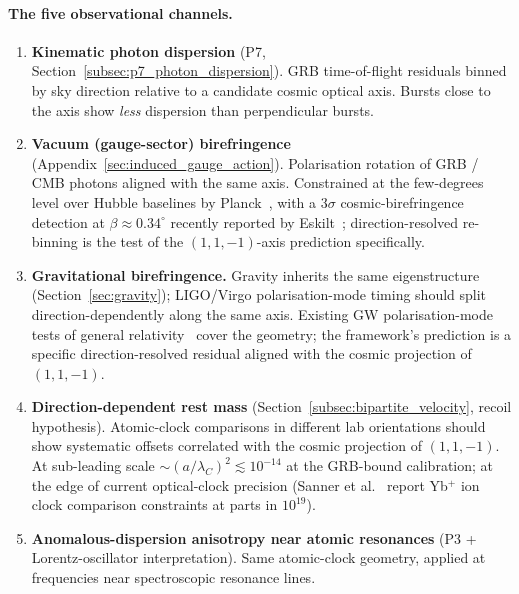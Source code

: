\paragraph{The five observational channels.}
\begin{enumerate}
    \item \textbf{Kinematic photon dispersion} (P7,
        Section~\ref{subsec:p7_photon_dispersion}).  GRB time-of-flight
        residuals binned by sky direction relative to a candidate
        cosmic optical axis.  Bursts close to the axis show
        \emph{less} dispersion than perpendicular bursts.
    \item \textbf{Vacuum (gauge-sector) birefringence}
        (Appendix~\ref{sec:induced_gauge_action}).
        Polarisation rotation of GRB / CMB photons aligned with the
        same axis.  Constrained at the few-degrees level over Hubble
        baselines by Planck~\cite{planck2020}, with a $3\sigma$
        cosmic-birefringence detection at $\beta \approx 0.34^\circ$
        recently reported by Eskilt~\cite{eskilt2022};
        direction-resolved re-binning is the test of the
        $(1,1,-1)$-axis prediction specifically.
    \item \textbf{Gravitational birefringence.}  Gravity inherits the
        same eigenstructure (Section~\ref{sec:gravity}); LIGO/Virgo
        polarisation-mode timing should split direction-dependently
        along the same axis.  Existing GW polarisation-mode tests of
        general relativity~\cite{will2014} cover the geometry; the
        framework's prediction is a specific direction-resolved
        residual aligned with the cosmic projection of $(1,1,-1)$.
    \item \textbf{Direction-dependent rest mass}
        (Section~\ref{subsec:bipartite_velocity}, recoil hypothesis).
        Atomic-clock comparisons in different lab orientations should
        show systematic offsets correlated with the cosmic projection
        of $(1,1,-1)$.  At sub-leading scale
        $\sim (a/\lambda_C)^2 \lesssim 10^{-14}$ at the GRB-bound
        calibration; at the edge of current optical-clock precision
        (Sanner et al.~\cite{sanner2019} report Yb$^+$ ion clock
        comparison constraints at parts in $10^{19}$).
    \item \textbf{Anomalous-dispersion anisotropy near atomic
        resonances} (P3 + Lorentz-oscillator interpretation).  Same
        atomic-clock geometry, applied at frequencies near
        spectroscopic resonance lines.
\end{enumerate}

